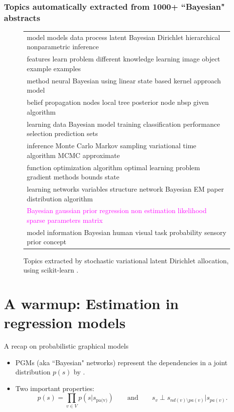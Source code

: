 \documentclass[10pt]{beamer}
\begin{document}
\begin{frame}
  \frametitle{Topics automatically extracted from 1000+ ``Bayesian" abstracts}
  \begin{figure}
    \footnotesize
    \begin{tabular}{|l|}
    \hline
      \textcolor{vert}{model models data process latent Bayesian Dirichlet hierarchical nonparametric inference}\\
      features learn problem different knowledge learning image object example examples\\
      method neural Bayesian using linear state based kernel approach model\\
      belief propagation nodes local tree posterior node nbsp given algorithm\\
      learning data Bayesian model training classification performance selection prediction sets\\
      \textcolor{bleu}{inference Monte Carlo Markov sampling variational time algorithm MCMC approximate}\\
      function optimization algorithm optimal learning problem gradient methods bounds state\\
      learning networks variables structure network Bayesian EM paper distribution algorithm\\
      \textcolor{magenta}{Bayesian gaussian prior regression non estimation likelihood sparse parameters matrix}\\
      model information Bayesian human visual task probability sensory prior concept\\
    \hline
    \end{tabular}
    \caption{Topics extracted by stochastic variational latent Dirichlet allocation, using {scikit-learn} \citep{sklearn11}.
    \label{f:bayesianTopics}}
    \end{figure}
\end{frame}

\section{A warmup: Estimation in regression models}

\begin{frame}{A recap on probabilistic graphical models \citep[Section 10.5]{Mur12}}
  \begin{itemize}
    \item PGMs (aka ``Bayesian" networks) represent the dependencies in a joint distribution $p(s)$ by .
    \item Two important properties:
    $$
    p(s) = \prod_{v\in V} p(s\vert s_{\text{pa(v)}}) \qquad\text{and}\qquad
    s_v \perp s_{nd(v)\setminus pa(v)} \vert s_{pa(v)}.
    $$
  \end{itemize}
  \blank
\end{frame}
\end{document}
